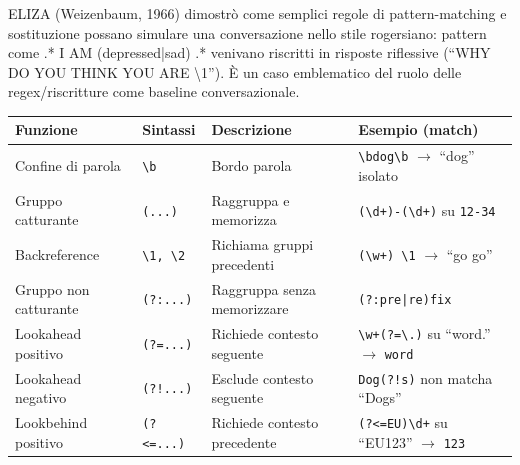         ELIZA (Weizenbaum, 1966) dimostrò come semplici regole di pattern-matching e sostituzione possano simulare una conversazione nello stile rogersiano: pattern come .* I AM (depressed|sad) .* venivano riscritti in risposte riflessive (“WHY DO YOU THINK YOU ARE \textbackslash 1”). È un caso emblematico del ruolo delle regex/riscritture come baseline conversazionale.
        
        \begin{table}[h]
            \centering
            
            \begin{tabular}{@{}llll@{}}
            
                \toprule
                
                \textbf{Funzione} & \textbf{Sintassi} & \textbf{Descrizione} & \textbf{Esempio (match)} \\
                
                \midrule
                
                Confine di parola & \texttt{\textbackslash b} & Bordo parola & \texttt{\textbackslash bdog\textbackslash b} $\to$ ``dog'' isolato \\
                
                Gruppo catturante & \texttt{(...)} & Raggruppa e memorizza & \texttt{(\textbackslash d+)-(\textbackslash d+)} su \texttt{12-34} \\
                
                Backreference & \texttt{\textbackslash 1, \textbackslash 2} & Richiama gruppi precedenti & \texttt{(\textbackslash w+)\ \textbackslash 1} $\to$ ``go go'' \\
                
                Gruppo non catturante & \texttt{(?:...)} & Raggruppa senza memorizzare & \texttt{(?:pre|re)fix} \\
                
                Lookahead positivo & \texttt{(?=...)} & Richiede contesto seguente & \texttt{\textbackslash w+(?=\textbackslash .)} su ``word.'' $\to$ \texttt{word} \\
                
                Lookahead negativo & \texttt{(?!...)} & Esclude contesto seguente & \texttt{Dog(?!s)} non matcha ``Dogs'' \\
                
                Lookbehind positivo & \texttt{(?<=...)} & Richiede contesto precedente & \texttt{(?<=EU)\textbackslash d+} su ``EU123'' $\to$ \texttt{123} \\
                

\end{tabular}
\end{table}
